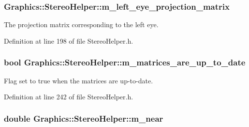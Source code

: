 \hypertarget{class_graphics_1_1_stereo_helper_abe0f5805dd94b0d277b00c7d8ce89fd1}{
\subsubsection[{m\_\-left\_\-eye\_\-projection\_\-matrix}]{ {\bf Graphics::StereoHelper::m\_\-left\_\-eye\_\-projection\_\-matrix}}}
\label{class_graphics_1_1_stereo_helper_abe0f5805dd94b0d277b00c7d8ce89fd1}


The projection matrix corresponding to the left eye. 



Definition at line 198 of file StereoHelper.h.

\hypertarget{class_graphics_1_1_stereo_helper_a83274d674fe2f833ecab9dc67a32c64d}{
\subsubsection[{m\_\-matrices\_\-are\_\-up\_\-to\_\-date}]{\setlength{\rightskip}{0pt plus 5cm}bool {\bf Graphics::StereoHelper::m\_\-matrices\_\-are\_\-up\_\-to\_\-date}}}
\label{class_graphics_1_1_stereo_helper_a83274d674fe2f833ecab9dc67a32c64d}


Flag set to true when the matrices are up-\/to-\/date. 



Definition at line 242 of file StereoHelper.h.

\hypertarget{class_graphics_1_1_stereo_helper_ab6261035a7d4ed8d7de0a56a53efcaae}{
\subsubsection[{m\_\-near}]{\setlength{\rightskip}{0pt plus 5cm}double {\bf Graphics::StereoHelper::m\_\-near}}}
\label{class_graphics_1_1_stereo_helper_ab6261035a7d4ed8d7de0a56a53efcaae}


